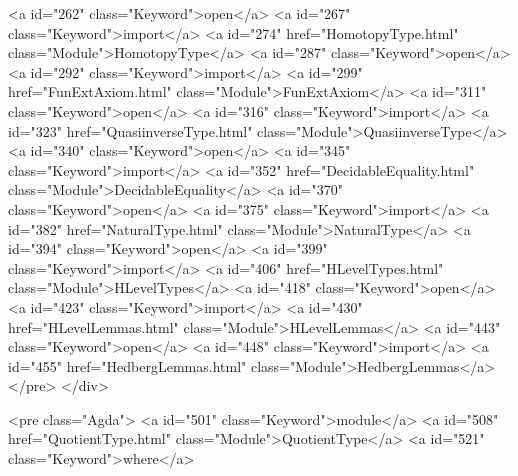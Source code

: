 <a id="262" class="Keyword">open</a> <a id="267" class="Keyword">import</a> <a id="274" href="HomotopyType.html" class="Module">HomotopyType</a>
<a id="287" class="Keyword">open</a> <a id="292" class="Keyword">import</a> <a id="299" href="FunExtAxiom.html" class="Module">FunExtAxiom</a>
<a id="311" class="Keyword">open</a> <a id="316" class="Keyword">import</a> <a id="323" href="QuasiinverseType.html" class="Module">QuasiinverseType</a>
<a id="340" class="Keyword">open</a> <a id="345" class="Keyword">import</a> <a id="352" href="DecidableEquality.html" class="Module">DecidableEquality</a>
<a id="370" class="Keyword">open</a> <a id="375" class="Keyword">import</a> <a id="382" href="NaturalType.html" class="Module">NaturalType</a>
<a id="394" class="Keyword">open</a> <a id="399" class="Keyword">import</a> <a id="406" href="HLevelTypes.html" class="Module">HLevelTypes</a>
<a id="418" class="Keyword">open</a> <a id="423" class="Keyword">import</a> <a id="430" href="HLevelLemmas.html" class="Module">HLevelLemmas</a>
<a id="443" class="Keyword">open</a> <a id="448" class="Keyword">import</a> <a id="455" href="HedbergLemmas.html" class="Module">HedbergLemmas</a>
</pre>
</div>

<pre class="Agda">
<a id="501" class="Keyword">module</a> <a id="508" href="QuotientType.html" class="Module">QuotientType</a> <a id="521" class="Keyword">where</a>

